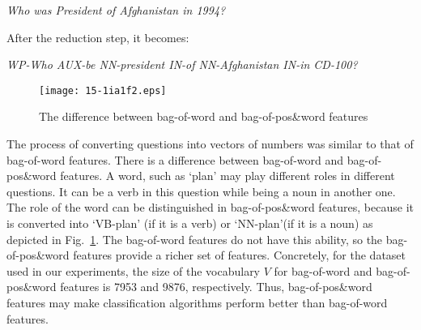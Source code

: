 \documentclass[english]{jnlp_1.4}
\begin{document}
\textit{Who was President of Afghanistan in 1994?}

After the reduction step, it becomes:

 \textit{WP-Who AUX-be NN-president IN-of NN-Afghanistan IN-in CD-100?}

\begin{figure}[b]
\begin{center}
    \texttt{[image: 15-1ia1f2.eps]}
\end{center}
\caption{The difference between bag-of-word and bag-of-pos\&word
features} \label{fig:difference}
\end{figure}



The process of converting questions into vectors of numbers was
similar to that of bag-of-word features. There is a difference
between bag-of-word and bag-of-pos\&word features. A word, such as
`plan' may play different roles in different questions. It can be
a verb in this question while being a noun in another one. The
role of the word can be distinguished in bag-of-pos\&word
features, because it is converted into `VB-plan' (if it is a verb)
or `NN-plan'(if it is a noun) as depicted in
Fig.~\ref{fig:difference}. The bag-of-word features do not have
this ability, so the bag-of-pos\&word features provide a richer
set of features. Concretely, for the dataset used in our
experiments, the size of the vocabulary $V$ for bag-of-word and
bag-of-pos\&word features is 7953 and 9876, respectively. Thus,
bag-of-pos\&word features may make classification algorithms
perform better than bag-of-word features.
\end{document}
